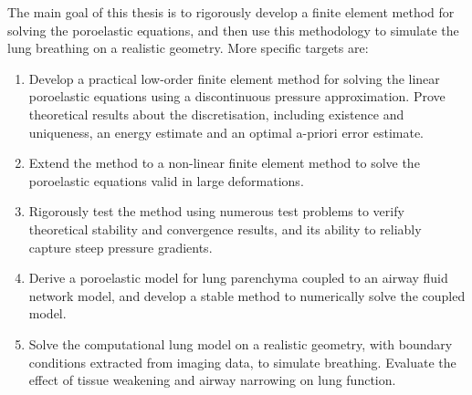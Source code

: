 The main goal of this thesis is to rigorously develop a finite element method for solving the poroelastic equations, and then use this methodology to simulate the lung breathing on a realistic geometry. More specific targets are:
\begin{enumerate}%
 \item Develop a practical low-order finite element method for solving the linear poroelastic equations using a discontinuous pressure approximation. Prove theoretical results about the discretisation, including existence and uniqueness, an energy estimate and an optimal a-priori error estimate.
\item Extend the method to a non-linear finite element method to solve the poroelastic equations valid in large deformations.
 \item Rigorously test the method using numerous test problems to verify theoretical stability and convergence results, and its ability to reliably capture steep pressure gradients. 
 \item Derive a poroelastic model for lung parenchyma coupled to an airway fluid network model, and develop a stable method to numerically solve the coupled model.
  \item Solve the computational lung model on a realistic geometry, with boundary conditions extracted from imaging data, to simulate breathing. Evaluate the effect of tissue weakening and airway narrowing on lung function.
\end{enumerate}



%
%
%
%
%
